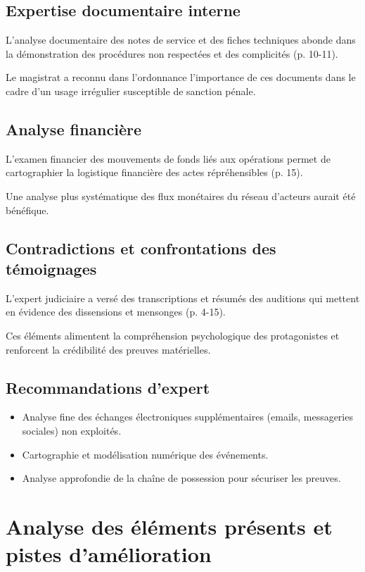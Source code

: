 \documentclass[12pt,a4paper]{article}
\begin{document}
	\subsection{Expertise documentaire interne}
	
	L'analyse documentaire des notes de service et des fiches techniques abonde dans la démonstration des procédures non respectées et des complicités (p. 10-11).
	
	Le magistrat a reconnu dans l'ordonnance l'importance de ces documents dans le cadre d'un usage irrégulier susceptible de sanction pénale.
	
	\subsection{Analyse financière}
	
	L'examen financier des mouvements de fonds liés aux opérations permet de cartographier la logistique financière des actes répréhensibles (p. 15).
	
	Une analyse plus systématique des flux monétaires du réseau d'acteurs aurait été bénéfique.
	
	\subsection{Contradictions et confrontations des témoignages}
	
	L'expert judiciaire a versé des transcriptions et résumés des auditions qui mettent en évidence des dissensions et mensonges (p. 4-15).
	
	Ces éléments alimentent la compréhension psychologique des protagonistes et renforcent la crédibilité des preuves matérielles.
	
	\subsection{Recommandations d'expert}
	
	\begin{itemize}[leftmargin=*]
		\item Analyse fine des échanges électroniques supplémentaires (emails, messageries sociales) non exploités.
		\item Cartographie et modélisation numérique des événements.
		\item Analyse approfondie de la chaîne de possession pour sécuriser les preuves.
	\end{itemize}
	
	\section{Analyse des éléments présents et pistes d'amélioration}
	
\end{document}
